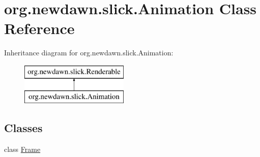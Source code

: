 \hypertarget{classorg_1_1newdawn_1_1slick_1_1_animation}{}\section{org.\+newdawn.\+slick.\+Animation Class Reference}
\label{classorg_1_1newdawn_1_1slick_1_1_animation}
Inheritance diagram for org.\+newdawn.\+slick.\+Animation\+:\begin{figure}[H]
\begin{center}
\leavevmode
\includegraphics[height=2.000000cm]{classorg_1_1newdawn_1_1slick_1_1_animation}
\end{center}
\end{figure}
\subsection*{Classes}
\begin{DoxyCompactItemize}
\item 
class \mbox{\hyperlink{classorg_1_1newdawn_1_1slick_1_1_animation_1_1_frame}{Frame}}
\end{DoxyCompactItemize}
